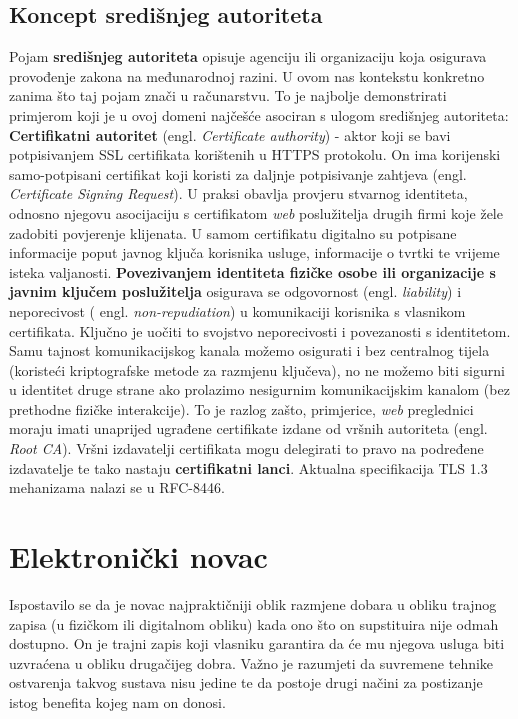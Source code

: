 \documentclass[utf8, zavrsni]{fer}
\begin{document}
\section{Koncept središnjeg autoriteta}
Pojam \textbf{središnjeg autoriteta} opisuje agenciju ili organizaciju koja osigurava provođenje zakona na međunarodnoj razini\cite{enwiki:969028445}. U ovom nas kontekstu konkretno zanima što taj pojam znači u računarstvu. To je najbolje demonstrirati primjerom koji je u ovoj domeni najčešće asociran s ulogom središnjeg autoriteta: \textbf{Certifikatni autoritet} (engl. \textit{Certificate authority}) - aktor koji se bavi potpisivanjem SSL certifikata korištenih u HTTPS protokolu. On ima korijenski samo-potpisani certifikat koji koristi za daljnje potpisivanje zahtjeva (engl. \textit{Certificate Signing Request}). U praksi obavlja provjeru stvarnog identiteta, odnosno njegovu asocijaciju s certifikatom \textit{web} poslužitelja drugih firmi koje žele zadobiti povjerenje klijenata. U samom certifikatu digitalno su potpisane informacije poput javnog ključa korisnika usluge, informacije o tvrtki te vrijeme isteka valjanosti. \textbf{Povezivanjem identiteta fizičke osobe ili organizacije s javnim ključem poslužitelja} osigurava se odgovornost (engl. \textit{liability}) i neporecivost ( engl. \textit{non-repudiation}) u komunikaciji korisnika s vlasnikom certifikata. Ključno je uočiti to svojstvo neporecivosti i povezanosti s identitetom. Samu tajnost komunikacijskog kanala možemo osigurati i bez centralnog tijela (koristeći kriptografske metode za razmjenu ključeva), no ne možemo biti sigurni u identitet druge strane ako prolazimo nesigurnim komunikacijskim kanalom (bez prethodne fizičke interakcije). To je razlog zašto, primjerice, \textit{web} preglednici moraju imati unaprijed ugrađene certifikate izdane od vršnih autoriteta (engl. \textit{Root CA}). Vršni izdavatelji certifikata mogu delegirati to pravo na podređene izdavatelje te tako nastaju \textbf{certifikatni lanci}. Aktualna specifikacija TLS 1.3 mehanizama nalazi se u RFC-8446.


\chapter{Elektronički novac}

Ispostavilo se da je novac najpraktičniji oblik razmjene dobara u obliku trajnog zapisa (u fizičkom ili digitalnom obliku) kada ono što on supstituira nije odmah dostupno. On je trajni zapis koji vlasniku garantira da će mu njegova usluga biti uzvraćena u obliku drugačijeg dobra. Važno je razumjeti da suvremene tehnike ostvarenja takvog sustava nisu jedine te da postoje drugi načini za postizanje istog benefita kojeg nam on donosi.
\end{document}
